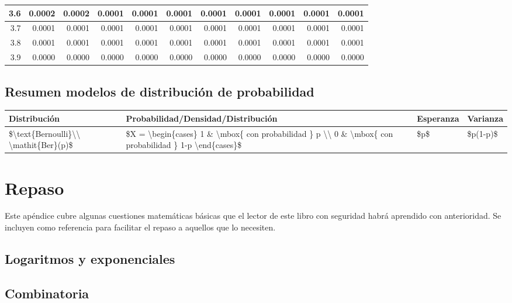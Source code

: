 \documentclass[
]{book}
\begin{document}
\begin{tabular}{r|r|r|r|r|r|r|r|r|r|r}
\hline
3.6 & 0.0002 & 0.0002 & 0.0001 & 0.0001 & 0.0001 & 0.0001 & 0.0001 & 0.0001 & 0.0001 & 0.0001\\
\hline
3.7 & 0.0001 & 0.0001 & 0.0001 & 0.0001 & 0.0001 & 0.0001 & 0.0001 & 0.0001 & 0.0001 & 0.0001\\
\hline
3.8 & 0.0001 & 0.0001 & 0.0001 & 0.0001 & 0.0001 & 0.0001 & 0.0001 & 0.0001 & 0.0001 & 0.0001\\
\hline
3.9 & 0.0000 & 0.0000 & 0.0000 & 0.0000 & 0.0000 & 0.0000 & 0.0000 & 0.0000 & 0.0000 & 0.0000\\
\hline
\end{tabular}

\hypertarget{resumen-modelos-de-distribuciuxf3n-de-probabilidad}{%
\section{Resumen modelos de distribución de probabilidad}\label{resumen-modelos-de-distribuciuxf3n-de-probabilidad}}

\begin{tabular}{l|l|l|l}
\hline
Distribución & Probabilidad/Densidad/Distribución & Esperanza & Varianza\\
\hline
\$\textbackslash{}text\{Bernoulli\}\textbackslash{}\textbackslash{} \textbackslash{}mathit\{Ber\}(p)\$ & \$X = \textbackslash{}begin\{cases\} 1 \& \textbackslash{}mbox\{ con probabilidad \} p \textbackslash{}\textbackslash{} 0 \& \textbackslash{}mbox\{ con probabilidad \} 1-p \textbackslash{}end\{cases\}\$ & \$p\$ & \$p(1-p)\$\\
\hline
\end{tabular}

\hypertarget{repaso}{%
\chapter{Repaso}\label{repaso}}

Este apéndice cubre algunas cuestiones matemáticas básicas que el lector
de este libro con seguridad habrá aprendido con anterioridad. Se incluyen
como referencia para facilitar el repaso a aquellos que lo necesiten.

\hypertarget{logaritmos-y-exponenciales}{%
\section{Logaritmos y exponenciales}\label{logaritmos-y-exponenciales}}

\hypertarget{combinatoria}{%
\section{Combinatoria}\label{combinatoria}}
\end{document}
